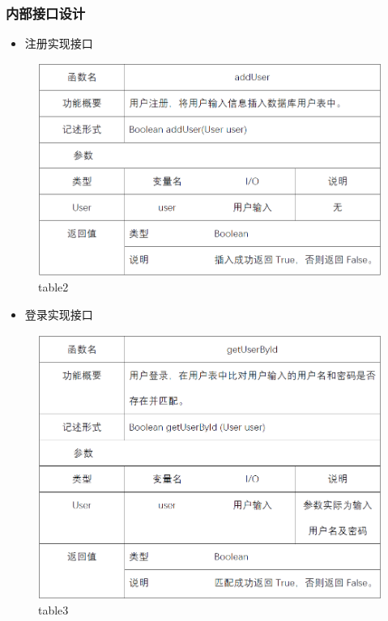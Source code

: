 \subsubsection{内部接口设计}
\begin{itemize}
	\item 注册实现接口
\end{itemize}
\begin{figure}[!htbp]
	\centering
	\includegraphics[scale=0.7]{image/b2.png} %
	\caption{table2} %
\end{figure}
\begin{itemize} 
	\item 登录实现接口
\end{itemize}
\begin{figure}[!htbp]
	\centering
	\includegraphics[scale=0.7]{image/b3.png} %
	\caption{table3} %
\end{figure}
